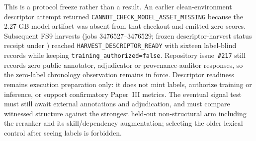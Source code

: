 This is a protocol freeze rather than a result.  An earlier clean-environment descriptor attempt returned \texttt{CANNOT\_CHECK\_MODEL\_ASSET\_MISSING} because the 2.27-GB model artifact was absent from that checkout and emitted zero scores.  Subsequent FS9 harvests (jobs 3476527--3476529; frozen descriptor-harvest status receipt under ) reached \texttt{HARVEST\_DESCRIPTOR\_READY} with sixteen label-blind records while keeping \texttt{training\_authorized=false}.  Repository issue~\texttt{\#217} still records zero public annotator, adjudicator or provenance-auditor responses, so the zero-label chronology observation remains in force.  Descriptor readiness remains execution preparation only: it does not mint labels, authorize training or inference, or support confirmatory Paper~III metrics.  The eventual signal test must still await external annotations and adjudication, and must compare witnessed structure against the strongest held-out non-structural arm including the reranker and its skill/dependency augmentation; selecting the older lexical control after seeing labels is forbidden.

